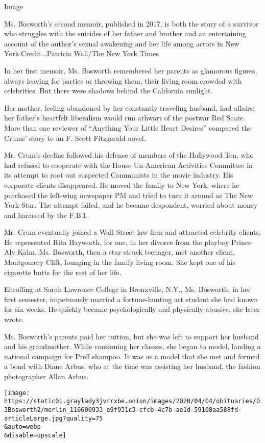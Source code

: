 Image

Ms. Bosworth's second memoir, published in 2017, is both the story of a
survivor who struggles with the suicides of her father and brother and
an entertaining account of the author's sexual awakening and her life
among actors in New York.Credit...Patricia Wall/The New York Times

In her first memoir, Ms. Bosworth remembered her parents as glamorous
figures, always leaving for parties or throwing them, their living room
crowded with celebrities. But there were shadows behind the California
sunlight.

Her mother, feeling abandoned by her constantly traveling husband, had
affairs; her father's heartfelt liberalism would run athwart of the
postwar Red Scare. More than one reviewer of ``Anything Your Little
Heart Desires'' compared the Crums' story to an F. Scott Fitzgerald
novel.

Mr. Crum's decline followed his defense of members of the Hollywood Ten,
who had refused to cooperate with the House Un-American Activities
Committee in its attempt to root out suspected Communists in the movie
industry. His corporate clients disappeared. He moved the family to New
York, where he purchased the left-wing newspaper PM and tried to turn it
around as The New York Star. The attempt failed, and he became
despondent, worried about money and harassed by the F.B.I.

Mr. Crum eventually joined a Wall Street law firm and attracted
celebrity clients. He represented Rita Hayworth, for one, in her divorce
from the playboy Prince Aly Kahn. Ms. Bosworth, then a star-struck
teenager, met another client, Montgomery Clift, lounging in the family
living room. She kept one of his cigarette butts for the rest of her
life.

Enrolling at Sarah Lawrence College in Bronxville, N.Y., Ms. Bosworth,
in her first semester, impetuously married a fortune-hunting art student
she had known for six weeks. He quickly became psychologically and
physically abusive, she later wrote.

Ms. Bosworth's parents paid her tuition, but she was left to support her
husband and his grandmother. While continuing her classes, she began to
model, landing a national campaign for Prell shampoo. It was as a model
that she met and formed a bond with Diane Arbus, who at the time was
assisting her husband, the fashion photographer Allan Arbus.

\texttt{[image: https://static01.graylady3jvrrxbe.onion/images/2020/04/04/obituaries/03Bosworth2/merlin\_116600933\_e9f931c3-cfcb-4c7b-ae1d-59108aa588fd-articleLarge.jpg?quality=75\\\&auto=webp\\\&disable=upscale]}

